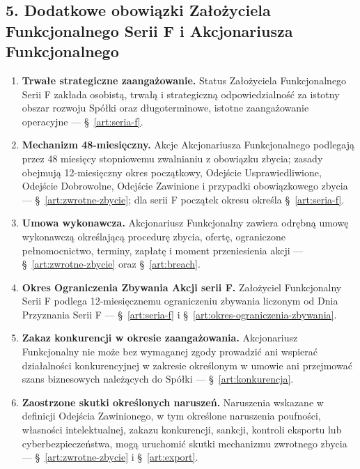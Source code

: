 \documentclass[12pt,a4paper]{report}
\begin{document}
\subsection*{5. Dodatkowe obowiązki Założyciela Funkcjonalnego Serii F i Akcjonariusza Funkcjonalnego}
\begin{enumerate}
  \item \textbf{Trwałe strategiczne zaangażowanie.} Status Założyciela Funkcjonalnego Serii F zakłada osobistą, trwałą i strategiczną odpowiedzialność za istotny obszar rozwoju Spółki oraz długoterminowe, istotne zaangażowanie operacyjne — §~\ref{art:seria-f}.
  \item \textbf{Mechanizm 48-miesięczny.} Akcje Akcjonariusza Funkcjonalnego podlegają przez 48 miesięcy stopniowemu zwalnianiu z obowiązku zbycia; zasady obejmują 12-miesięczny okres początkowy, Odejście Usprawiedliwione, Odejście Dobrowolne, Odejście Zawinione i przypadki obowiązkowego zbycia — §~\ref{art:zwrotne-zbycie}; dla serii F początek okresu określa §~\ref{art:seria-f}.
  \item \textbf{Umowa wykonawcza.} Akcjonariusz Funkcjonalny zawiera odrębną umowę wykonawczą określającą procedurę zbycia, ofertę, ograniczone pełnomocnictwo, terminy, zapłatę i moment przeniesienia akcji — §~\ref{art:zwrotne-zbycie} oraz §~\ref{art:breach}.
  \item \textbf{Okres Ograniczenia Zbywania Akcji serii F.} Założyciel Funkcjonalny Serii F podlega 12-miesięcznemu ograniczeniu zbywania liczonym od Dnia Przyznania Serii F — §~\ref{art:seria-f} i §~\ref{art:okres-ograniczenia-zbywania}.
  \item \textbf{Zakaz konkurencji w okresie zaangażowania.} Akcjonariusz Funkcjonalny nie może bez wymaganej zgody prowadzić ani wspierać działalności konkurencyjnej w zakresie określonym w umowie ani przejmować szans biznesowych należących do Spółki — §~\ref{art:konkurencja}.
  \item \textbf{Zaostrzone skutki określonych naruszeń.} Naruszenia wskazane w definicji Odejścia Zawinionego, w tym określone naruszenia poufności, własności intelektualnej, zakazu konkurencji, sankcji, kontroli eksportu lub cyberbezpieczeństwa, mogą uruchomić skutki mechanizmu zwrotnego zbycia — §~\ref{art:zwrotne-zbycie} i §~\ref{art:export}.
\end{enumerate}
\end{document}

